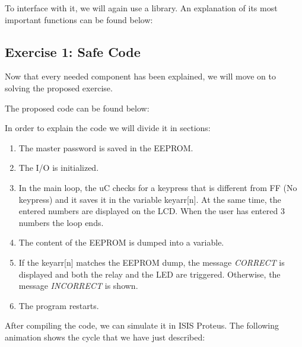 To interface with it, we will again use a library. An explanation of its most important functions can be found below:



\subsection{Exercise 1: Safe Code}

Now that every needed component has been explained, we will move on to solving the proposed exercise.\medskip

The proposed code can be found below:


\clearpage

\noindent In order to explain the code we will divide it in sections:

\begin{enumerate}
    \item The master password is saved in the EEPROM.
    \item The I/O is initialized.
    \item In the main loop, the uC checks for a keypress that is different from FF (No keypress) and it saves it in the variable keyarr[n]. At the same time, the entered numbers are displayed on the LCD. When the user has entered 3 numbers the loop ends.
    \item The content of the EEPROM is dumped into a variable.
    \item If the keyarr[n] matches the EEPROM dump, the message \textit{CORRECT} is displayed and both the relay and the LED are triggered. Otherwise, the message \textit{INCORRECT} is shown. 
    \item The program restarts.
\end{enumerate}

After compiling the code, we can simulate it in ISIS Proteus. The following animation shows the cycle that we have just described:

